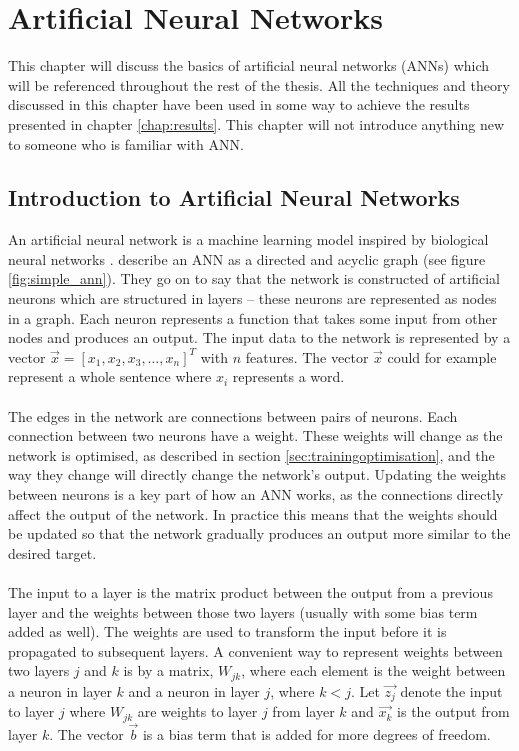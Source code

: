 \chapter{Artificial Neural Networks}\label{chap:ann}
This chapter will discuss the basics of artificial neural networks (ANNs) which will be referenced throughout the rest of the thesis. All the techniques and theory discussed in this chapter have been used in some way to achieve the results presented in chapter \ref{chap:results}. This chapter will not introduce anything new to someone who is familiar with ANN.

\section{Introduction to Artificial Neural Networks}
An artificial neural network is a machine learning model inspired by biological neural networks \parencite{lippmann1987introduction}. \cite{Goodfellow-et-al-2016} describe an ANN as a directed and acyclic graph (see figure \ref{fig:simple_ann}). They go on to say that the network is constructed of artificial neurons which are structured in layers -- these neurons are represented as nodes in a graph. Each neuron represents a function that takes some input from other nodes and produces an output. The input data to the network is represented by a vector $\vec{x} = [x_1, x_2, x_3, \dots, x_n]^T$ with $n$ features. The vector $\vec{x}$ could for example represent a whole sentence where $x_i$ represents a word.
\\\\
The edges in the network are connections between pairs of neurons. Each connection between two neurons have a weight. These weights will change as the network is optimised, as described in section \ref{sec:trainingoptimisation}, and the way they change will directly change the network's output. Updating the weights between neurons is a key part of how an ANN works, as the connections directly affect the output of the network. In practice this means that the weights should be updated so that the network gradually produces an output more similar to the desired target. 
\\\\
The input to a layer is the matrix product between the output from a previous layer and the weights between those two layers (usually with some bias term added as well). The weights are used to transform the input before it is propagated to subsequent layers. A convenient way to represent weights between two layers $j$ and $k$ is by a matrix, $W_{jk}$, where each element is the weight between a neuron in layer $k$ and a neuron in layer $j$, where $k<j$. Let $\vec{z_j}$ denote the input to layer $j$ where $W_{jk}$ are weights to layer $j$ from layer $k$ and $\vec{x_k}$ is the output from layer $k$. The vector $\vec{b}$ is a bias term that is added for more degrees of freedom. 
